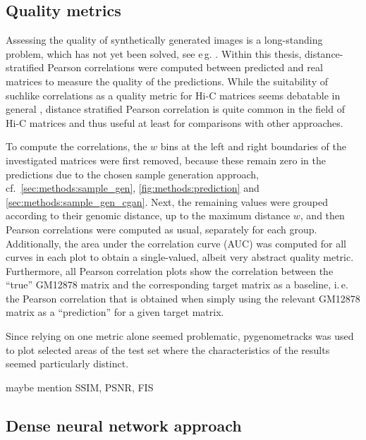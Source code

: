 \subsection{Quality metrics}
Assessing the quality of synthetically generated images is a long-standing problem, which has not yet been solved, see e\,g. \cite[p.\,19]{Wang2020}.
Within this thesis, distance-stratified Pearson correlations were computed between predicted and real matrices to measure the quality of the predictions.
While the suitability of suchlike correlations as a quality metric for Hi-C matrices seems debatable in general \cite{Yang2017}, 
distance stratified Pearson correlation is quite common in the field of Hi-C matrices and thus useful at least for comparisons with other approaches.

To compute the correlations, the $w$ bins at the left and right boundaries of the investigated matrices were first removed, because these remain zero 
in the predictions due to the chosen sample generation approach, 
cf.~\cref{sec:methods:sample_gen}, \cref{fig:methods:prediction} and \ref{sec:methods:sample_gen_cgan}.
Next, the remaining values were grouped according to their genomic distance, up to the maximum distance $w$, 
and then Pearson correlations were computed as usual, separately for each group.
Additionally, the area under the correlation curve (AUC) was computed for all curves in each plot to obtain a single-valued, albeit very abstract quality metric.
Furthermore, all Pearson correlation plots show the correlation between the ``true'' GM12878 matrix and the corresponding target matrix as a baseline,
i.\,e. the Pearson correlation that is obtained when simply using the relevant GM12878 matrix as a ``prediction'' for a given target matrix.

Since relying on one metric alone seemed problematic, pygenometracks \cite{LopezDelisle2020} was used to plot selected areas of the test set 
where the characteristics of the results seemed particularly distinct.

\xxx maybe mention SSIM, PSNR, FIS \xxx

\subsection{Dense neural network approach}

